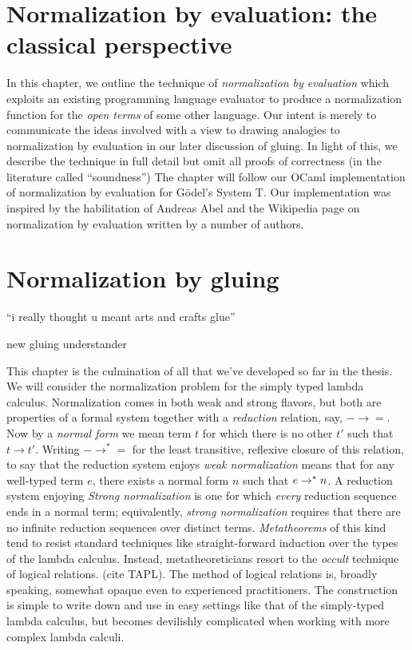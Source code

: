 \documentclass[12pt,twoside]{reedthesis}
\theoremstyle{definition}
\theoremstyle{remark}
\theoremstyle{plain}
\begin{document}
\chapter{Normalization by evaluation: the classical perspective}
In this chapter, we outline the technique of \emph{normalization by evaluation}
which exploits an existing programming language evaluator to produce a
normalization function for the \emph{open terms} of some other language. Our
intent is merely to communicate the ideas involved with a view to drawing
analogies to normalization by evaluation in our later discussion of gluing. In
light of this, we describe the technique in full detail but omit all proofs of
correctness (in the literature called ``soundness'') %
The chapter will follow our OCaml implementation of normalization by evaluation
for G\"odel's System T. Our implementation was inspired by the habilitation of
Andreas Abel and the Wikipedia page on normalization by evaluation written by a
number of authors.

\chapter{Normalization by gluing}\label{chapter:gluing}
\epigraph{``i really thought u meant arts and crafts glue''}{new gluing understander}

This chapter is the culmination of all that we've developed so far in the
thesis. We will consider the normalization problem for the simply typed lambda
calculus. Normalization comes in both weak and strong flavors, but both are
properties of a formal system together with a \emph{reduction} relation, say,
\( - \rightarrow = \). Now by a \emph{normal form} we mean term $t$ for which there is no
other $t'$ such that \( t \rightarrow t' \). Writing \( - \rightarrow^{*} = \) for the least
transitive, reflexive closure of this relation, to say that the reduction system
enjoys \emph{weak normalization} means that for any well-typed term \( e \),
there exists a normal form \( n \) such that \( e \rightarrow^{*} n\). A reduction system
enjoying \emph{Strong normalization} is one for which \emph{every} reduction
sequence ends in a normal term; equivalently, \emph{strong normalization}
requires that there are no infinite reduction sequences over distinct terms.
\emph{Metatheorems} of this kind tend to resist standard techniques like
straight-forward induction over the types of the lambda calculus. Instead,
metatheoreticians resort to the \emph{occult} technique of logical relations.
(cite TAPL). The method of logical relations is, broadly speaking, somewhat
opaque even to experienced practitioners. The construction is simple to write
down and use in easy settings like that of the simply-typed lambda calculus, but
becomes devilishly complicated when working with more complex lambda calculi.
\end{document}
